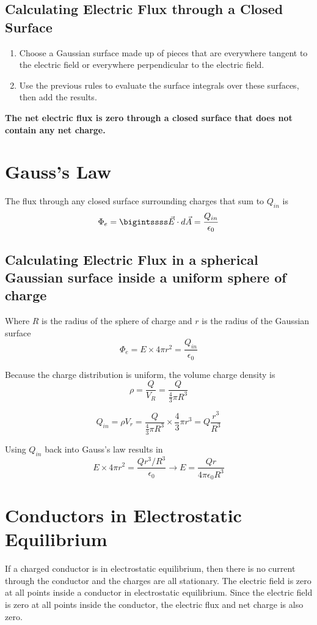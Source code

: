 \documentclass{article}
\begin{document}
\subsection*{Calculating Electric Flux through a Closed Surface}
\begin{enumerate}
    \item Choose a Gaussian surface made up of pieces that are everywhere tangent to the electric field or everywhere perpendicular to the electric field.
    \item Use the previous rules to evaluate the surface integrals over these surfaces, then add the results.
\end{enumerate}
\textbf{The net electric flux is zero through a closed surface that does not contain any net charge.}

\section*{Gauss's Law}
The flux through any closed surface surrounding charges that sum to $Q_{in}$ is
\[\Phi_e = \bigintssss \vec{E}\cdot d\vec{A} = \frac{Q_{in}}{\epsilon_0}\]

\subsection*{Calculating Electric Flux in a spherical Gaussian surface inside a uniform sphere of charge}
Where $R$ is the radius of the sphere of charge and $r$ is the radius of the Gaussian surface
\[\Phi_e = E\times 4\pi r^2 = \frac{Q_{in}}{\epsilon_0}\]

Because the charge distribution is uniform, the volume charge density is
\[\rho = \frac{Q}{V_R} = \frac{Q}{\frac{4}{3}\pi R^3}\]

\[Q_{in} = \rho V_r=\frac{Q}{\frac{4}{3}\pi R^3}\times\frac{4}{3}\pi r^3=Q\frac{r^3}{R^3}\]

Using $Q_{in}$ back into Gauss's law results in
\[E\times 4\pi r^2 = \frac{Qr^3 / R^3}{\epsilon_0}\rightarrow E=\frac{Qr}{4\pi\epsilon_0 R^3}\]

\section*{Conductors in Electrostatic Equilibrium}
If a charged conductor is in electrostatic equilibrium, then there is no current through the conductor and the charges are all stationary. The electric field is zero at all points inside a conductor in electrostatic equilibrium. Since the electric field is zero at all points inside the conductor, the electric flux and net charge is also zero.\newline
\end{document}
